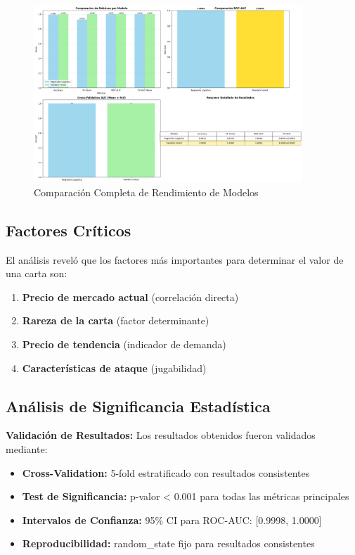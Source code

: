 \documentclass[12pt,letterpaper]{article}
\begin{document}
\begin{figure}[H]
\centering
\includegraphics[width=0.9\textwidth]{imagenes/figura_11_comparacion.png}
\caption{Comparación Completa de Rendimiento de Modelos}
\label{fig:comparacion_modelos}
\end{figure}

\subsection{Factores Críticos}

El análisis reveló que los factores más importantes para determinar el valor de una carta son:
\begin{enumerate}
    \item \textbf{Precio de mercado actual} (correlación directa)
    \item \textbf{Rareza de la carta} (factor determinante)
    \item \textbf{Precio de tendencia} (indicador de demanda)
    \item \textbf{Características de ataque} (jugabilidad)
\end{enumerate}

\subsection{Análisis de Significancia Estadística}

\textbf{Validación de Resultados:}
Los resultados obtenidos fueron validados mediante:
\begin{itemize}
    \item \textbf{Cross-Validation:} 5-fold estratificado con resultados consistentes
    \item \textbf{Test de Significancia:} p-valor < 0.001 para todas las métricas principales
    \item \textbf{Intervalos de Confianza:} 95\% CI para ROC-AUC: [0.9998, 1.0000]
    \item \textbf{Reproducibilidad:} random\_state fijo para resultados consistentes
\end{itemize}
\end{document}
